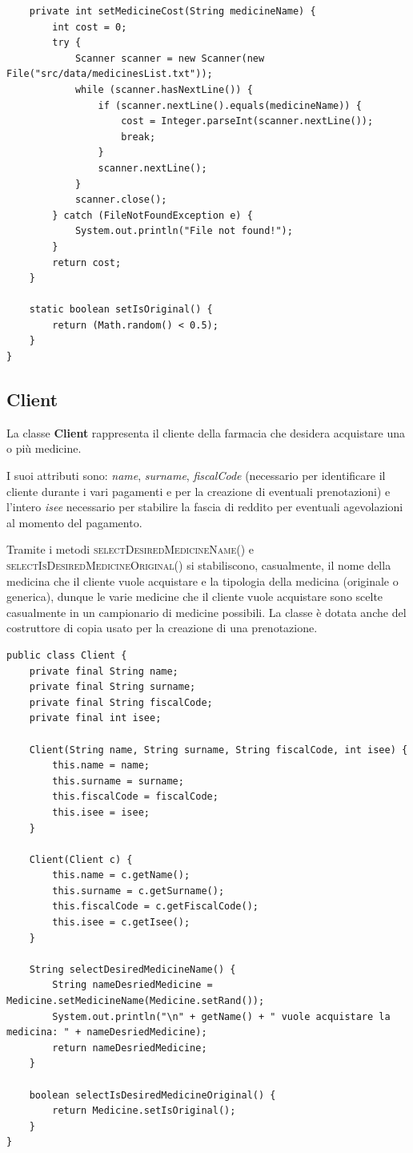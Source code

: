 \documentclass[a4paper, 10pt]{report}
\begin{document}
\begin{lstlisting}
    private int setMedicineCost(String medicineName) {
        int cost = 0;
        try {
            Scanner scanner = new Scanner(new File("src/data/medicinesList.txt"));
            while (scanner.hasNextLine()) {
                if (scanner.nextLine().equals(medicineName)) {
                    cost = Integer.parseInt(scanner.nextLine());
                    break;
                }
                scanner.nextLine();
            }
            scanner.close();
        } catch (FileNotFoundException e) {
            System.out.println("File not found!");
        }
        return cost;
    }

    static boolean setIsOriginal() {
        return (Math.random() < 0.5);
    }
}
\end{lstlisting}
\subsection{Client}
La classe \textbf{Client} rappresenta il cliente della farmacia che desidera acquistare una o più medicine.

I suoi attributi sono: \textit{name}, \textit{surname}, \textit{fiscalCode} (necessario per identificare il cliente durante i vari pagamenti e per la creazione di eventuali prenotazioni) e l'intero \textit{isee} necessario per stabilire la fascia di reddito per eventuali agevolazioni al momento del pagamento.

Tramite i metodi \textsc{selectDesiredMedicineName()} e \textsc{selectIsDesiredMedicineOriginal()} si stabiliscono, casualmente, il nome della medicina che il cliente vuole acquistare e la tipologia della medicina (originale o generica), dunque le varie medicine che il cliente vuole acquistare sono scelte casualmente in un campionario di medicine possibili. La classe è dotata anche del costruttore di copia usato per la creazione di una prenotazione.\\
\begin{lstlisting}
public class Client {
    private final String name;
    private final String surname;
    private final String fiscalCode;
    private final int isee;

    Client(String name, String surname, String fiscalCode, int isee) {
        this.name = name;
        this.surname = surname;
        this.fiscalCode = fiscalCode;
        this.isee = isee;
    }

    Client(Client c) {
        this.name = c.getName();
        this.surname = c.getSurname();
        this.fiscalCode = c.getFiscalCode();
        this.isee = c.getIsee();
    }

    String selectDesiredMedicineName() {
        String nameDesriedMedicine = Medicine.setMedicineName(Medicine.setRand());
        System.out.println("\n" + getName() + " vuole acquistare la medicina: " + nameDesriedMedicine);
        return nameDesriedMedicine;
    }

    boolean selectIsDesiredMedicineOriginal() {
        return Medicine.setIsOriginal();
    }
}
\end{lstlisting}
\end{document}
